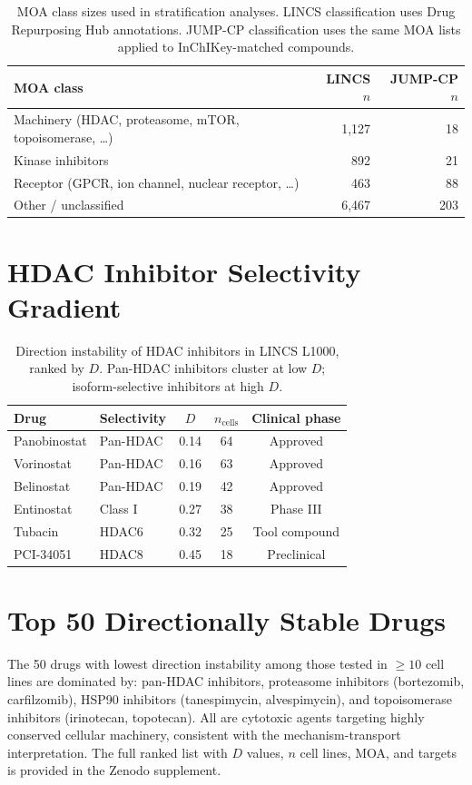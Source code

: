 \documentclass[11pt]{article}
\begin{document}
\begin{table}[h]
\centering
\caption{MOA class sizes used in stratification analyses. LINCS
classification uses Drug Repurposing Hub annotations. JUMP-CP
classification uses the same MOA lists applied to InChIKey-matched
compounds.}
\begin{tabular}{lrr}
\toprule
MOA class & LINCS $n$ & JUMP-CP $n$ \\
\midrule
Machinery (HDAC, proteasome, mTOR, topoisomerase, \ldots) & 1{,}127 & 18 \\
Kinase inhibitors & 892 & 21 \\
Receptor (GPCR, ion channel, nuclear receptor, \ldots) & 463 & 88 \\
Other / unclassified & 6{,}467 & 203 \\
\bottomrule
\end{tabular}
\end{table}

\section{HDAC Inhibitor Selectivity Gradient}
\label{app:hdac}

\begin{table}[h]
\centering
\caption{Direction instability of HDAC inhibitors in LINCS L1000, ranked
by $D$. Pan-HDAC inhibitors cluster at low $D$; isoform-selective
inhibitors at high $D$.}
\begin{tabular}{llccc}
\toprule
Drug & Selectivity & $D$ & $n_{\text{cells}}$ & Clinical phase \\
\midrule
Panobinostat & Pan-HDAC & 0.14 & 64 & Approved \\
Vorinostat & Pan-HDAC & 0.16 & 63 & Approved \\
Belinostat & Pan-HDAC & 0.19 & 42 & Approved \\
Entinostat & Class I & 0.27 & 38 & Phase III \\
Tubacin & HDAC6 & 0.32 & 25 & Tool compound \\
PCI-34051 & HDAC8 & 0.45 & 18 & Preclinical \\
\bottomrule
\end{tabular}
\end{table}

\section{Top 50 Directionally Stable Drugs}
\label{app:top50}

The 50 drugs with lowest direction instability among those tested in
$\geq 10$ cell lines are dominated by: pan-HDAC inhibitors,
proteasome inhibitors (bortezomib, carfilzomib), HSP90 inhibitors
(tanespimycin, alvespimycin), and topoisomerase inhibitors (irinotecan,
topotecan). All are cytotoxic agents targeting highly conserved cellular
machinery, consistent with the mechanism-transport interpretation.
The full ranked list with $D$ values, $n$ cell lines, MOA, and targets
is provided in the Zenodo supplement.
\end{document}

